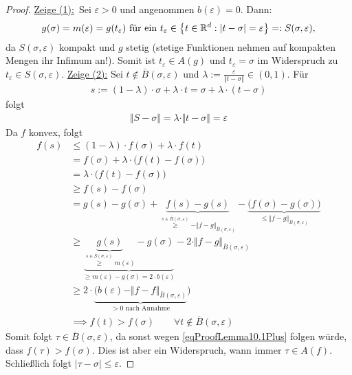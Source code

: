\begin{proof}
	\underline{Zeige (1):}\
		Sei $\varepsilon>0$ und angenommen $b(\varepsilon)=0$.
		Dann:
		\begin{align*}
			g(\sigma)=m(\varepsilon)=g(t_\varepsilon)
			\text{ für ein }t_\varepsilon\in
			\big\lbrace t\in\mathbb{R}^d:|t-\sigma|=\varepsilon\big\rbrace=:S(\sigma,\varepsilon),
		\end{align*}
		da $S(\sigma,\varepsilon)$ kompakt und $g$ stetig (stetige Funktionen nehmen auf kompakten Mengen ihr Infimum an!).
		Somit ist $t_\varepsilon\in A(g)$ und $t_\varepsilon=\sigma$ im Widerspruch zu $t_\varepsilon\in S(\sigma,\varepsilon)$.\nl
	\underline{Zeige (2):}
	Sei $t\not\in\overline{B}(\sigma,\varepsilon)$ und $\lambda:=\frac{\varepsilon}{\Vert t-\sigma\Vert}\in(0,1)$.
	Für
	\begin{align*}
		s:=(1-\lambda)\cdot\sigma+\lambda\cdot t
		=\sigma+\lambda\cdot(t-\sigma)
	\end{align*}
	folgt
	\begin{align}\label{eqProofLemma10.1Stern}\tag{$\ast$}
		\Vert S-\sigma\Vert=\lambda\cdot\Vert t-\sigma\Vert
		=\varepsilon
	\end{align}
	Da $f$ konvex, folgt
	\begin{align}\nonumber
		f(s)
		&\leq(1-\lambda)\cdot f(\sigma)+\lambda\cdot f(t)\\\nonumber
		&=f(\sigma)+\lambda\cdot\big(f(t)-f(\sigma)\big)\\\nonumber
		&=\lambda\cdot\big(f(t)-f(\sigma)\big)\\\nonumber
		&\geq f(s)-f(\sigma)\\\nonumber
		&=g(s)-g(\sigma)+\underbrace{f(s)-g(s)}_{
			\overset{s\in\overline{B}(\sigma,\varepsilon)}{\geq}-\Vert f-g\Vert_{\overline{B}(\sigma,\varepsilon)}
		}-\underbrace{\big(f(\sigma)-g(\sigma)\big)}_{
			\leq\Vert f-g\Vert_{\overline{B}(\sigma,\varepsilon)}
		}\\\nonumber
		&\geq \underbrace{\underbrace{g(s)}_{
			\overset{s\in S(\sigma,\varepsilon)}{\geq}m(\varepsilon)
		}-g(\sigma)}_{
			\geq m(\varepsilon)-g(\sigma)=2\cdot b(\varepsilon)
		}-2\cdot\Vert f-g\Vert_{\overline{B}(\sigma,\varepsilon)}\\\nonumber
		&\geq 2\cdot\underbrace{\Big(b(\varepsilon)-\Vert f-f\Vert_{\overline{B}(\sigma,\varepsilon)}}_{
			>0\text{ nach Annahme}
		}\Big)\\
		&\implies f(t)>f(\sigma)\qquad\forall t\not\in \overline{B}(\sigma,\varepsilon)\label{eqProofLemma10.1Plus}\tag{+}
	\end{align}
	Somit folgt $\tau\in\overline{B}(\sigma,\varepsilon)$, da sonst wegen \eqref{eqProofLemma10.1Plus} folgen würde, dass $f(\tau)>f(\sigma)$.
	Dies ist aber ein Widerspruch, wann immer $\tau\in A(f)$.
	Schließlich folgt $|\tau-\sigma|\leq\varepsilon$.
\end{proof}

